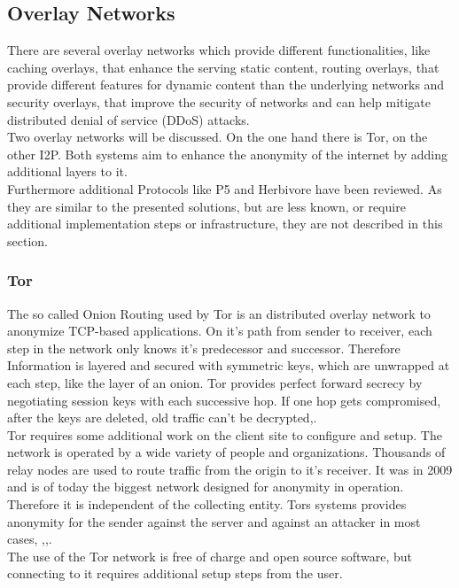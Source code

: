     \subsection{Overlay Networks}
        \label{subsec:related:overlay}
        There are several overlay networks which provide different functionalities, like caching overlays, that enhance the serving static content, routing overlays, that provide different features for dynamic content than the underlying networks and security overlays,  that improve the security of networks and can help mitigate distributed denial of service (DDoS) attacks\cite{pathan_overlay_2014}.\\
        Two overlay networks will be discussed. On the one hand there is Tor\cite{dingledine_tor_2004}, on the other I2P\cite{}. Both systems aim to enhance the anonymity of the internet by adding additional layers to it.\\
        Furthermore additional Protocols like P5\cite{sherwood_p_2005} and Herbivore\cite{goel_herbivore_2003} have been reviewed. As they are similar to the presented solutions, but are less known, or require additional implementation steps or infrastructure, they are not described in this section.
     
     
    \subsubsection{Tor}
        The so called Onion Routing used  by Tor is an distributed overlay network to anonymize TCP-based applications. On it's path from sender to receiver, each step in the network only knows it's predecessor and successor. Therefore Information is layered and secured with symmetric keys, which are unwrapped at each step, like the layer of an onion.
        Tor provides perfect forward secrecy by negotiating session keys with each successive hop. If one hop gets compromised, after the keys are deleted, old traffic can't be decrypted\cite{dingledine_tor_2004},\cite{borisov_shining_2008}.\\
        Tor requires some additional work on the client site to configure and setup. 
        The network is operated by a wide variety of people and organizations.
        Thousands of relay nodes are used to route traffic from the origin to it's receiver. It was in 2009 and is of today the biggest network designed for anonymity in operation\cite{edman_anonymity_2009}.
        Therefore it is independent of the collecting entity. Tors systems provides anonymity for the sender against the server and against an attacker in most cases\cite{arma_one_2009}, \cite{poulsen_feds_2013},\cite{samson_tor_2013},\cite{herrmann_website_2009}.\\
        The use of the Tor network is free of charge and open source software, but connecting to it requires additional setup steps from the user.\\
    
